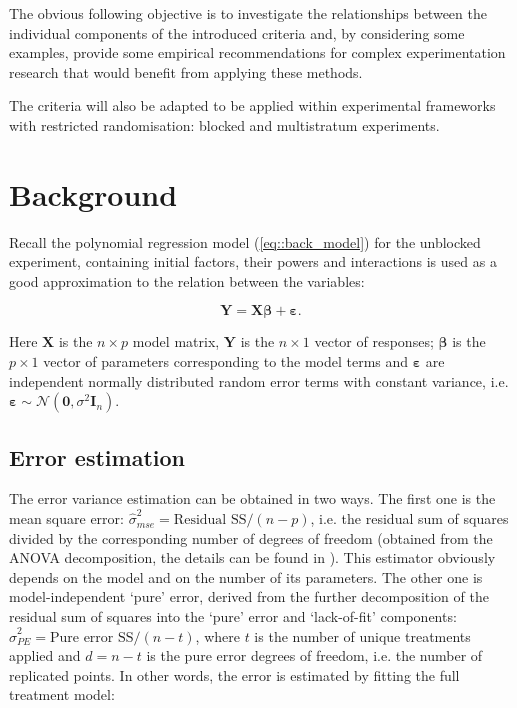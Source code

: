 \documentclass[11pt]{article}
\begin{document}
The obvious following objective is to investigate the relationships between the individual components of the introduced criteria and, by considering some examples, provide some empirical recommendations for complex experimentation research that would benefit from applying these methods.

The criteria will also be adapted to be applied within experimental frameworks with restricted randomisation: blocked and multistratum experiments.

\section{Background}

Recall the polynomial regression model (\ref{eq::back_model}) for the unblocked experiment, containing initial factors, their powers and interactions is used as a good approximation to the relation between the variables:  

\begin{equation}
\label{eq::back_model}
\bm{Y}=\bm{X\beta}+\bm{\varepsilon}.
\end{equation} 

Here $\bm{X}$ is the $n\times p$ model matrix, $\bm{Y}$ is the $n\times 1$ vector of responses; $\bm{\beta}$ is the $p\times 1$ vector of parameters corresponding to the model terms and $\bm{\varepsilon}$ are independent normally distributed random error terms with constant variance, i.e. $\bm{\varepsilon}\sim \mathcal{N}(\bm{0},\sigma^{2}\bm{I}_{n})$.

\subsection{Error estimation}
The error variance estimation can be obtained in two ways. The first one is the mean square error: $\hat{\sigma}^2_{mse}=\mbox{Residual SS}/(n-p)$, i.e. the residual sum of squares divided by the corresponding number of degrees of freedom (obtained from the ANOVA decomposition, the details can be found in \cite{Draper1998}). This estimator obviously depends on the model and on the number of its parameters. The other one is model-independent `pure' error, derived from the further decomposition of the residual sum of squares into the `pure' error and `lack-of-fit' components: $\hat{\sigma}^2_{PE}=\mbox{Pure error SS}/(n-t)$, where $t$ is the number of unique treatments applied and $d=n-t$ is the pure error degrees of freedom, i.e. the number of replicated points. In other words, the error is estimated by fitting the full treatment model:
\end{document}
